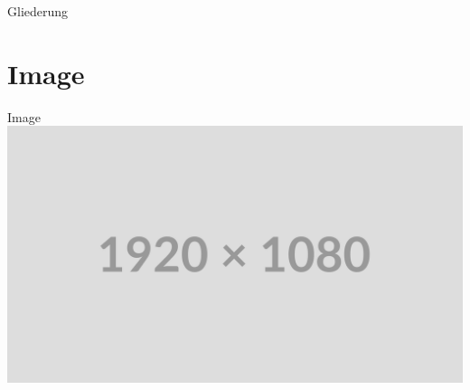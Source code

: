 
\begin{frame}{Gliederung}
    \tableofcontents
\end{frame}



\section{Image}

\begin{frame}{Image}
    \includegraphics[width=\textwidth]{assets/placeholder.png}
\end{frame}
